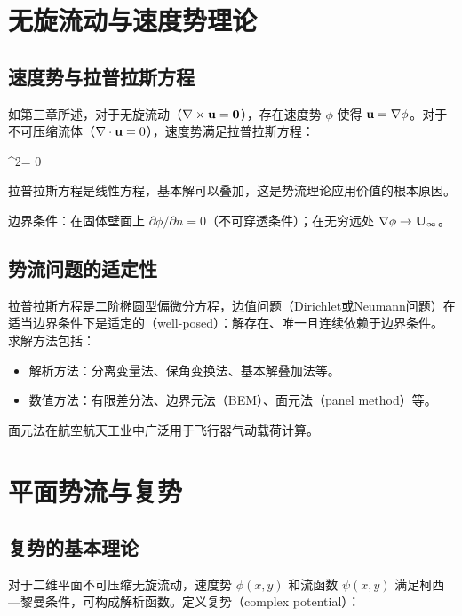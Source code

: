 \section{无旋流动与速度势理论}

\subsection{速度势与拉普拉斯方程}

如第三章所述，对于无旋流动（\(\nabla\times\mathbf{u} = \mathbf{0}\)），存在速度势 \(\phi\) 使得 \(\mathbf{u} = \nabla\phi\)。对于不可压缩流体（\(\nabla\cdot\mathbf{u} = 0\)），速度势满足拉普拉斯方程：

\begin{myformula}
\Nabla^2\phi = 0
\end{myformula}

拉普拉斯方程是线性方程，基本解可以叠加，这是势流理论应用价值的根本原因。

边界条件：在固体壁面上 \(\partial\phi/\partial n = 0\)（不可穿透条件）；在无穷远处 \(\nabla\phi \to \mathbf{U}_\infty\)。

\subsection{势流问题的适定性}

拉普拉斯方程是二阶椭圆型偏微分方程，边值问题（Dirichlet或Neumann问题）在适当边界条件下是适定的（well-posed）：解存在、唯一且连续依赖于边界条件。求解方法包括：
\begin{itemize}
    \item 解析方法：分离变量法、保角变换法、基本解叠加法等。
    \item 数值方法：有限差分法、边界元法（BEM）、面元法（panel method）等。
\end{itemize}

面元法在航空航天工业中广泛用于飞行器气动载荷计算。

\section{平面势流与复势}

\subsection{复势的基本理论}

对于二维平面不可压缩无旋流动，速度势 \(\phi(x,y)\) 和流函数 \(\psi(x,y)\) 满足柯西—黎曼条件，可构成解析函数。定义复势（complex potential）：

